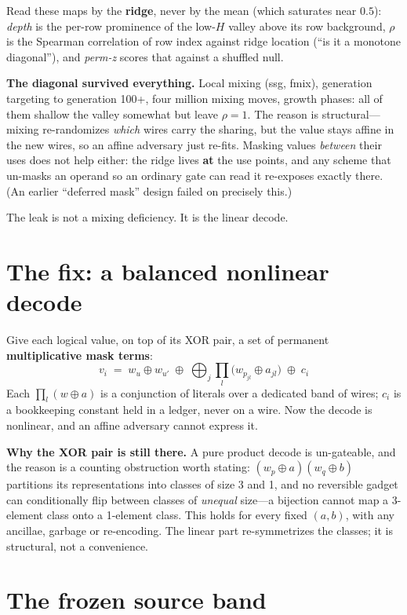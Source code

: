 \documentclass[11pt]{article}
\newcommand{\xor}{\oplus}
\begin{document}
Read these maps by the \textbf{ridge}, never by the mean (which saturates near
$0.5$): \emph{depth} is the per-row prominence of the low-$H$ valley above its
row background, $\rho$ is the Spearman correlation of row index against ridge
location (``is it a monotone diagonal''), and \emph{perm-z} scores that against
a shuffled null.

\textbf{The diagonal survived everything.} Local mixing (ssg, fmix), generation
targeting to generation 100+, four million mixing moves, growth phases: all of
them shallow the valley somewhat but leave $\rho=1$. The reason is
structural---mixing re-randomizes \emph{which} wires carry the sharing, but the
value stays affine in the new wires, so an affine adversary just re-fits.
Masking values \emph{between} their uses does not help either: the ridge lives
\textbf{at} the use points, and any scheme that un-masks an operand so an
ordinary gate can read it re-exposes exactly there. (An earlier ``deferred
mask'' design failed on precisely this.)

The leak is not a mixing deficiency. It is the linear decode.

\section{The fix: a balanced nonlinear decode}

Give each logical value, on top of its XOR pair, a set of permanent
\textbf{multiplicative mask terms}:
\[
v_i \;=\; w_u \xor w_{u'} \;\xor\; \bigoplus_j \prod_l \bigl(w_{p_{jl}} \xor a_{jl}\bigr) \;\xor\; c_i
\]
Each $\prod_l (w\xor a)$ is a conjunction of literals over a dedicated band of
wires; $c_i$ is a bookkeeping constant held in a ledger, never on a wire. Now
the decode is nonlinear, and an affine adversary cannot express it.

\textbf{Why the XOR pair is still there.} A pure product decode is un-gateable,
and the reason is a counting obstruction worth stating: $(w_p\xor a)(w_q\xor b)$
partitions its representations into classes of size 3 and 1, and no reversible
gadget can conditionally flip between classes of \emph{unequal} size---a
bijection cannot map a 3-element class onto a 1-element class. This holds for
every fixed $(a,b)$, with any ancillae, garbage or re-encoding. The linear part
re-symmetrizes the classes; it is structural, not a convenience.

\section{The frozen source band}
\end{document}
